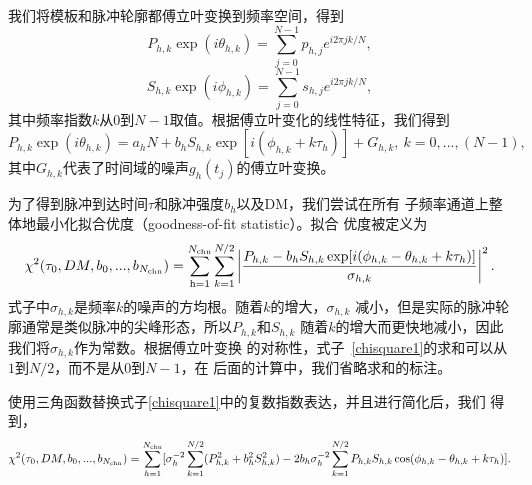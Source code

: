 我们将模板和脉冲轮廓都傅立叶变换到频率空间，得到
\begin{equation}
P_{h,k}\exp(i\theta_{h,k})=\sum_{j=0}^{N-1}p_{h,j}e^{i2\pi jk/N},
\end{equation}
\begin{equation}
S_{h,k}\exp(i\phi_{h,k})=\sum_{j=0}^{N-1}s_{h,j}e^{i2\pi jk/N},
\end{equation}
%
其中频率指数$k$从0到$N-1$取值。根据傅立叶变化的线性特征，我们得到
%
\begin{equation}
\label{eq1}
P_{h,k}\exp(i\theta_{h,k})=a_{h}N+b_{h}S_{h,k}\exp[i(\phi_{h,k}+k\tau_{h})]+G_{h,k},
\ k=0,...,(N-1),
\end{equation}
%
其中$G_{h,k}$代表了时间域的噪声$g_{h}(t_j)$的傅立叶变换。

为了得到脉冲到达时间$\tau$和脉冲强度$b_{h}$以及DM，我们尝试在所有
子频率通道上整体地最小化拟合优度（goodness-of-fit statistic）。拟合
优度被定义为
\begin{equation}
\label{chisquare1}
\chi^{2}(\tau_{0},DM,b_{0},...,b_{N_{\rm{chn}}})=\sum_{\rm{h}=1}^{N_{\rm{chn}}}\sum_{k=1}^{N/2}\left|\frac{P_{h,k}-b_{h}S_{h,k}\exp[i(\phi_{h,k}-\theta_{h,k}+k\tau_{h})]}{\sigma_{h,k}}\right|^2.
\end{equation}
%
式子中$\sigma_{h,k}$是频率$k$的噪声的方均根。随着$k$的增大，$\sigma_{h,k}$
减小，但是实际的脉冲轮廓通常是类似脉冲的尖峰形态，所以$P_{h,k}$和$S_{h,k}$
随着$k$的增大而更快地减小，因此我们将$\sigma_{h,k}$作为常数。根据傅立叶变换
的对称性，式子~\ref{chisquare1}的求和可以从$1$到$N/2$，而不是从0到$N-1$，在
后面的计算中，我们省略求和的标注。

使用三角函数替换式子\ref{chisquare1}中的复数指数表达，并且进行简化后，我们
得到，
\begin{equation}
\label{chisquare2}
\chi^{2}(\tau_{0},DM,b_{0},...,b_{N_{\rm{chn}}})=\sum_{h=1}^{N_{\rm{chn}}}[\sigma_{h}^{-2}\sum_{k=1}^{N/2}(P_{h,k}^2+b_{h}^{2}S_{h,k}^2)-2b_{h}\sigma_{h}^{-2}\sum_{k=1}^{N/2}P_{h,k}S_{h,k}\cos(\phi_{h,k}-\theta_{h,k}+k\tau_{h})].
\end{equation}

